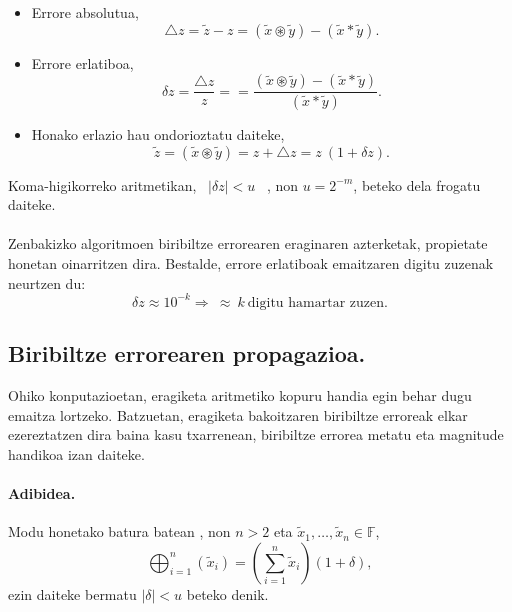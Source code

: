 \begin{itemize}
\item Errore absolutua,
\begin{equation*}
\triangle z=\tilde z-z =(\tilde x \circledast \tilde y) -(\tilde x \ast \tilde y).
\end{equation*} 
\item Errore erlatiboa,
\begin{equation*}
\delta z=\frac{\triangle z}{z}==\frac{(\tilde x \circledast \tilde y) -(\tilde x \ast \tilde y)}{(\tilde x \ast \tilde y)}.
\end{equation*} 
\item Honako erlazio hau ondorioztatu daiteke,
\begin{equation*}
\tilde z=(\tilde x \circledast \tilde y)=z+\triangle z=z \ (1+\delta z).  
\end{equation*}
\end{itemize}

Koma-higikorreko aritmetikan, \ $|\delta z|<u$ \ , non  $u=2^{-m}$, beteko dela frogatu daiteke.

\paragraph*{} Zenbakizko algoritmoen biribiltze errorearen eraginaren azterketak, propietate honetan oinarritzen dira. Bestalde, errore erlatiboak emaitzaren digitu zuzenak neurtzen du:
\begin{equation*}
\delta z \approx 10^{-k} \Rightarrow \ \approx \ k \ \mbox{digitu hamartar zuzen}.
\end{equation*}  


\subsection*{Biribiltze errorearen propagazioa.}


Ohiko konputazioetan, eragiketa aritmetiko kopuru handia egin behar dugu emaitza lortzeko. Batzuetan, eragiketa bakoitzaren biribiltze erroreak elkar ezereztatzen dira baina kasu txarrenean, biribiltze errorea metatu eta magnitude handikoa izan daiteke.   

\paragraph*{Adibidea.} 
Modu honetako batura batean , non $n>2$ eta $\tilde x_1,\dots,\tilde x_n \in \mathbb{F}$,  
\begin{equation*}
\bigoplus_{i=1}^{n}(\tilde x_i)=(\sum\limits_{i=1}^{n} \tilde x_i)(1+\delta),
\end{equation*}
ezin daiteke bermatu $|\delta|<u$ beteko denik. 

